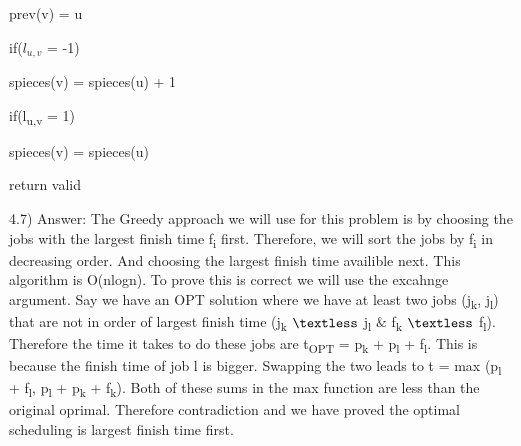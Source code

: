 \documentclass{article}
\begin{document}
\indent \indent \indent  \indent prev(v) = u



  \indent \indent \indent  \indent if($l_{u,v}$ = -1)






  \indent \indent \indent  \indent \indent spieces(v) = spieces(u) + 1




    \indent \indent \indent  \indent if(l\textsubscript{u,v} = 1)




    \indent \indent \indent  \indent \indent spieces(v) = spieces(u)




      return valid

      \clearpage

      4.7) Answer: The Greedy approach we will use for this problem is by choosing the jobs with the largest finish time f\textsubscript{i} first.
      Therefore, we will sort the jobs by f\textsubscript{i} in decreasing order.  And choosing the largest finish time availible next.  This algorithm is O(nlogn).
      To prove this is correct we will use the excahnge argument.  Say we have an OPT solution where we have at least two jobs (j\textsubscript{k}, j\textsubscript{l}) that are not in order of largest
      finish time (j\textsubscript{k} $\textless$ j\textsubscript{l} $\&$ f\textsubscript{k} $\textless$ f\textsubscript{l}).  Therefore the time it takes to do these jobs are t\textsubscript{OPT} =
      p\textsubscript{k} + p\textsubscript{l} + f\textsubscript{l}.  This is because the finish time of job l is bigger.  Swapping the two leads to t = max (p\textsubscript{l} + f\textsubscript{l}, p\textsubscript{l} + p\textsubscript{k} + f\textsubscript{k}).
      Both of these sums in the max function are less than the original oprimal.  Therefore contradiction and we have proved the optimal scheduling is largest finish time first.
\end{document}

